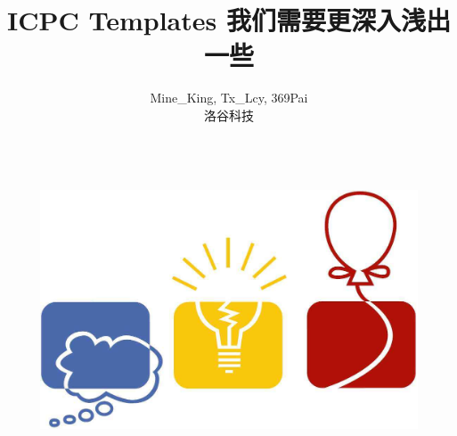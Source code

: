 \documentclass[12pt]{report}
\title{\Huge \textbf{ICPC Templates} \linebreak \linebreak \large \textcolor{primary-blue}{\textbf{我们需要更深入浅出一些}}}
\author{Mine\_King, Tx\_Lcy, 369Pai \\ \small 洛谷科技}
\begin{document}
\setlength{\headheight}{5mm}
\setlength{\headsep}{5mm}

\begin{titlepage}
    \begin{figure}
        \centering
        \includegraphics[height=8cm]{images/logo.jpg}
    \end{figure}
    
    \maketitle
\end{titlepage}


\tableofcontents       %
\clearpage


\newpage
\setcounter{page}{1}   %



%

%

%

%

%

%

%

%

%

\end{document}
